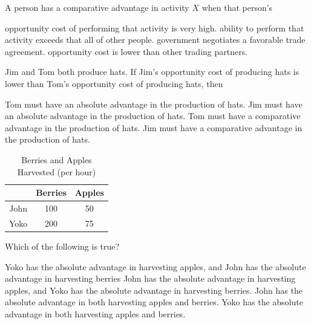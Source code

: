 \documentclass[addpoints,11pt]{exam}
\theoremstyle{definition}
\begin{document}
\begin{questions}

		\question A person has a comparative advantage in activity $X$ when that person's
		\begin{choices}
			\choice opportunity cost of performing that activity is very high.
			\choice ability to perform that activity exceeds that all of other people.
			\choice government negotiates a favorable trade agreement.
			\CorrectChoice opportunity cost is lower than other trading partners.
		\end{choices}
		
		
\question Jim and Tom both produce hats. If Jim's opportunity cost of producing hats is lower than Tom's opportunity cost of producing hats, then

\begin{choices}
	\choice Tom must have an absolute advantage in the production of hats.
	\choice Jim must have an absolute advantage in the production of hats.
	\choice Tom must have a comparative advantage in the production of hats.
	\CorrectChoice Jim must have a comparative advantage in the production of hats.
\end{choices}

		
\begin{table}[ht]
	\caption*{Berries and Apples Harvested (per hour)}
	\centering
	\begin{tabular}{  c| c  c }        
		
		& Berries & Apples \\
		\hline
		John & 100 & 50 \\
		
		Yoko  & 200 & 75 \\
		
	\end{tabular}
\end{table}

	\question \label{blah1} Which of the following is true?
		\begin{choices}
			\choice Yoko has the absolute advantage in harvesting apples, and John has the absolute advantage in harvesting berries
			\choice John has the absolute advantage in harvesting apples, and Yoko has the absolute
			advantage in harvesting berries.
			\choice John has the absolute advantage in both harvesting apples and berries.
			\CorrectChoice Yoko has the absolute advantage in both harvesting apples and berries.
		\end{choices}
		

\end{questions}
\end{document}
